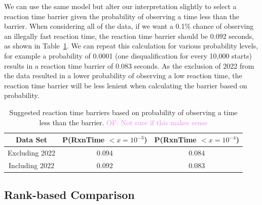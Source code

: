 \documentclass[12pt, letterpaper, titlepage]{article}
\newcommand{\of}[1]{\textcolor{violet}{OF: #1}}
\begin{document}
We can use the same model but alter our interpretation slightly to select a 
reaction time barrier given the probability of observing a time less than the 
barrier.  When considering all of the data, if we want a 0.1\% chance of 
observing an illegally fast reaction time, the reaction
time barrier should be 0.092 seconds, as shown in Table~\ref{tab:Sim_time}.  We
can repeat this calculation for various probability levels,
for example a probability of 0.0001 (one disqualification for every 10,000 starts)
results in a reaction time barrier of 0.083 seconds.  As the exclusion of 2022
from the data resulted in a lower probability of observing a low reaction time,
the reaction time barrier will be less lenient when calculating the barrier
based on probability.


\begin{table}
  \centering
  \caption{Suggested reaction time barriers based on probability of observing
  a time less than the barrier. \of{Not sure if this makes sense}}
  \begin{tabular}{c c c} 
   \toprule
   Data Set & P(RxnTime $< x = 10^{-3}$) & P(RxnTime $< x = 10^{-4}$) \\ 
   \midrule
   Excluding 2022 & $0.094$ & $0.084$ \\ 
   Including 2022 & $0.092$ & $0.083$ \\
   \bottomrule
  \end{tabular}
  \label{tab:Sim_time}
\end{table}




\subsection{Rank-based Comparison} \label{subsec:Results_Rank}
\end{document}
